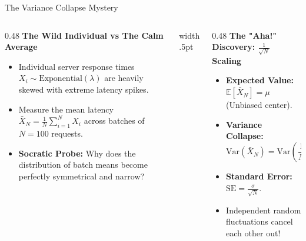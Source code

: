 \documentclass[../m00-session-03.tex]{subfiles}
\begin{document}
\begin{frame}[fragile]{The Variance Collapse Mystery}
  \begin{columns}[T,onlytextwidth]
    \begin{column}{0.48\textwidth}
      {\small\bfseries\color{UpGradRed}The Wild Individual vs The Calm Average}\par\vspace{0.08cm}
      \begin{itemize}\setlength{\itemsep}{0.20em}\small
        \item Individual server response times $X_i \sim \text{Exponential}(\lambda)$ are heavily skewed with extreme latency spikes.
        \item Measure the mean latency $\bar{X}_N = \frac{1}{N}\sum_{i=1}^N X_i$ across batches of $N = 100$ requests.
        \item \textcolor{UpGradRed}{\textbf{Socratic Probe:}} Why does the distribution of batch means become perfectly symmetrical and narrow?
      \end{itemize}
    \end{column}
    \hfill{\color{UpGradRule}\vrule width .5pt}\hfill
    \begin{column}{0.48\textwidth}
      {\small\bfseries\color{AWSEmerald}The "Aha!" Discovery: $\frac{1}{\sqrt{N}}$ Scaling}\par\vspace{0.08cm}
      \begin{itemize}\setlength{\itemsep}{0.18em}\small
        \item \textbf{Expected Value:} $\mathbb{E}[\bar{X}_N] = \mu$ (Unbiased center).
        \item \textbf{Variance Collapse:}
          \[
          \text{Var}(\bar{X}_N) = \text{Var}\left(\frac{1}{N}\sum X_i\right) = \frac{1}{N^2} \sum \sigma^2 = \frac{\sigma^2}{N}
          \]
        \item \textbf{Standard Error:} $\text{SE} = \frac{\sigma}{\sqrt{N}}$.
        \item Independent random fluctuations cancel each other out!
      \end{itemize}
      \vspace{0.04cm}
    \end{column}
  \end{columns}
\end{frame}
\end{document}
